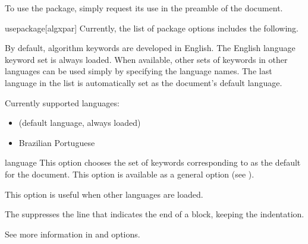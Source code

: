 \documentclass[a4paper, 11pt]{article}
\begin{document}
\medskip
To use the package, simply request its use in the preamble of the document.

\begin{macro*}{usepackage}{}[algxpar]
    Currently, the list of package options includes the following.

    \begin{option*}{}
        By default, algorithm keywords are developed in English. The English language keyword set is always loaded. When available, other sets of keywords in other languages can be used simply by specifying the language names. The last language in the list is automatically set as the document's default language.

        Currently supported languages:
        \begin{itemize}
            \item {} (default language, always loaded)
            \item {} Brazilian Portuguese
        \end{itemize}
    \end{option*}

    \begin{latexcode}
        \usepackage[brazilian]{algxpar}
    \end{latexcode}

    \begin{optionnoind}{language}{}
        This option chooses the set of keywords corresponding to  as the default for the document. This option is available as a general option (see ).

        This option is useful when other languages are loaded.
    \end{optionnoind}

    \begin{latexcode}
        \usepackage[brazilian, language = english]{algxpar}
    \end{latexcode}

    \begin{option*}{}
        The  suppresses the line that indicates the end of a block, keeping the indentation.

        See more information in  and  options.
    \end{option*}

    \begin{latexcode}
        \usepackage[noend]{algxpar}
    \end{latexcode}
\end{macro*}
\end{document}
